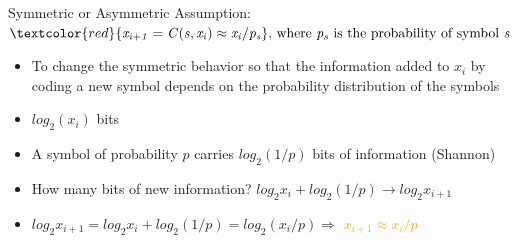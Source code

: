     \begin{frame}[fragile]{Symmetric or Asymmetric }
        Assumption: $\textcolor{red}{\mathit{x_{i+1} = C(s,x_i) \approx x_i/p_s}} \text{, where } \mathit{p_s} \text{ is the probability of symbol } \mathit{s}$
        \begin{itemize}
            \item<1-> To change the symmetric behavior so that the information added to $\mathit{x_i}$ by coding a new symbol depends on the probability distribution of the symbols
            \item<2-> $\mathit{log}_2(\mathit{x_i})$ bits
            \item<3-> A symbol of probability $\mathit{p}$ carries $\mathit{log}_2(1/\mathit{p})$ bits of information (Shannon)
            \item<4-> How many bits of new information? $\mathit{log}_2\mathit{x_i} + \mathit{log}_2(1/\mathit{p}) \rightarrow \mathit{log}_2\mathit{x_{i+1}}$
            \item<5-> $\mathit{log}_2\mathit{x_{i+1}} = \mathit{log}_2\mathit{x_i} + \mathit{log}_2(1/\mathit{p}) = \mathit{log}_2(\mathit{x_i/p}) \Rightarrow$
            {\fontsize{14pt}{12pt}\selectfont \textbf{\textcolor{orange}{ $\mathit{x_{i+1}} \approx \mathit{x_i/p}$}}}
        \end{itemize}
    \end{frame}

